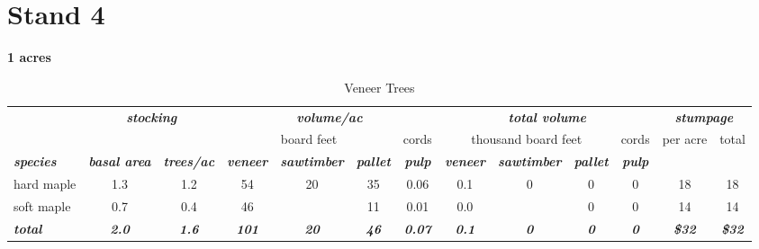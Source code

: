 \documentclass[landscape]{article}
\begin{document}
\pagebreak

\section{Stand 4}\label{stand-4}

\textbf{1 acres}

\begin{table}[H]

\caption{\label{tab:unnamed-chunk-32}Veneer Trees}
\fontsize{10}{12}\selectfont
\begin{tabular}[t]{lcccccccccccc}
\toprule
\multicolumn{1}{c}{\em{\textbf{ }}} & \multicolumn{2}{c}{\em{\textbf{stocking}}} & \multicolumn{4}{c}{\em{\textbf{volume/ac }}} & \multicolumn{4}{c}{\em{\textbf{total volume}}} & \multicolumn{2}{c}{\em{\textbf{stumpage}}} \\
\cmidrule(l{3pt}r{3pt}){2-3} \cmidrule(l{3pt}r{3pt}){4-7} \cmidrule(l{3pt}r{3pt}){8-11} \cmidrule(l{3pt}r{3pt}){12-13}
\multicolumn{3}{c}{ } & \multicolumn{3}{c}{board feet} & \multicolumn{1}{c}{cords} & \multicolumn{3}{c}{thousand board feet} & \multicolumn{1}{c}{cords} & \multicolumn{1}{c}{per acre} & \multicolumn{1}{c}{total} \\
\cmidrule(l{3pt}r{3pt}){4-6} \cmidrule(l{3pt}r{3pt}){7-7} \cmidrule(l{3pt}r{3pt}){8-10} \cmidrule(l{3pt}r{3pt}){11-11} \cmidrule(l{3pt}r{3pt}){12-12} \cmidrule(l{3pt}r{3pt}){13-13}
\rowcolor[HTML]{DCDCDC}  \em{\textbf{species}} & \em{\textbf{basal area}} & \em{\textbf{trees/ac}} & \em{\textbf{veneer}} & \em{\textbf{sawtimber}} & \em{\textbf{pallet}} & \em{\textbf{pulp}} & \em{\textbf{veneer}} & \em{\textbf{sawtimber}} & \em{\textbf{pallet}} & \em{\textbf{pulp}} & \em{\textbf{ }} & \em{\textbf{ }}\\
\midrule
\rowcolor{gray!6}  hard maple & 1.3 & 1.2 & 54 & 20 & 35 & 0.06 & 0.1 & 0 & 0 & 0 & 18 & 18\\
 
soft maple & 0.7 & 0.4 & 46 &  & 11 & 0.01 & 0.0 &  & 0 & 0 & 14 & 14\\
 
\rowcolor{gray!6}  \rowcolor[HTML]{DCDCDC}  \em{\textbf{total}} & \em{\textbf{2.0}} & \em{\textbf{1.6}} & \em{\textbf{101}} & \em{\textbf{20}} & \em{\textbf{46}} & \em{\textbf{0.07}} & \em{\textbf{0.1}} & \em{\textbf{0}} & \em{\textbf{0}} & \em{\textbf{0}} & \em{\textbf{\$32}} & \em{\textbf{\$32}}\\
\bottomrule
\end{tabular}
\end{table}
\end{document}
